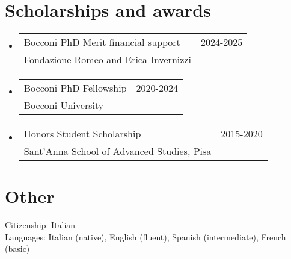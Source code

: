 \documentclass[A4,11pt]{article}
\makeatletter
\newcommand{\CVAw}[4]{
	\vspace{-2pt}\item
	\begin{tabular*}{0.97\textwidth}[t]{l@{\extracolsep{\fill}}r}
		#1 & #2 \\
		\small#3 & \small #4 \\
	\end{tabular*}\vspace{-7pt}
}
\newcommand{\CVSubHeadingListStart}{\begin{itemize}[leftmargin=0.5cm, label={}]}
\newcommand{\CVSubHeadingListEnd}{\end{itemize}}
\makeatother
\begin{document}
\vspace{1pt}

\section{Scholarships and awards}

\CVSubHeadingListStart
\CVAw{Bocconi PhD Merit financial support}{2024-2025}{Fondazione Romeo and Erica Invernizzi}{}
\CVAw{Bocconi PhD Fellowship}{2020-2024}{Bocconi University}{}
\CVAw{Honors Student Scholarship}{2015-2020}{Sant’Anna School of Advanced Studies, Pisa}{}

\CVSubHeadingListEnd


\vspace{1pt}

\section{Other}
\hspace{12pt} Citizenship: Italian\\
\smallskip
\hspace{12pt} Languages: Italian (native), English (fluent), Spanish (intermediate), French (basic)
    
\end{document}
